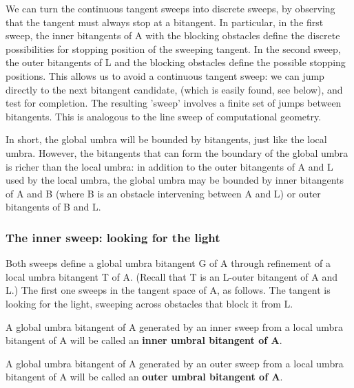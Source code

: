 \documentclass[12pt]{article}
\begin{document}
We can turn the continuous tangent sweeps into discrete sweeps,
by observing that the tangent must always stop at a bitangent.
In particular, in the first sweep,
the inner bitangents of A with the blocking obstacles define 
the discrete possibilities for stopping position of the sweeping tangent.
In the second sweep, the outer bitangents of L and the blocking obstacles
define the possible stopping positions.
This allows us to avoid a continuous tangent sweep:
we can jump directly to the next bitangent candidate,
(which is easily found, see below), and test for completion.
The resulting 'sweep' involves a finite set of jumps between bitangents.
This is analogous to the line sweep of computational geometry.

In short, the global umbra will be bounded by bitangents,
just like the local umbra.
However, the bitangents that can form the 
boundary of the global umbra is richer than the local umbra:
in addition to the outer bitangents of A and L used by the
local umbra, the global umbra may be bounded by inner bitangents of A and B
(where B is an obstacle intervening between A and L)
or outer bitangents of B and L.


\subsubsection{The inner sweep: looking for the light}

Both sweeps define a global umbra bitangent G of A
through refinement of a local umbra bitangent T of A.
(Recall that T is an L-outer bitangent of A and L.)
The first one sweeps in the tangent space of A, as follows.
The tangent is looking for the light, sweeping across obstacles 
that block it from L.

\begin{defn2}
A global umbra bitangent of A generated by an inner sweep from a local umbra 
bitangent of A will be called an {\bf inner umbral bitangent of A}.
\end{defn2}

\begin{defn2}
A global umbra bitangent of A generated by an outer sweep from a local umbra 
bitangent of A will be called an {\bf outer umbral bitangent of A}.
\end{defn2}
\end{document}
